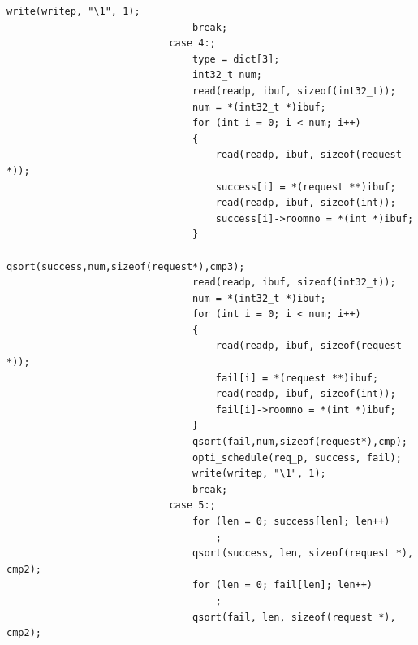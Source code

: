 \documentclass{article}
\begin{document}
\begin{Verbatim}[gobble=8]
                                write(writep, "\1", 1);
                                break;
                            case 4:;
                                type = dict[3];
                                int32_t num;
                                read(readp, ibuf, sizeof(int32_t));
                                num = *(int32_t *)ibuf;
                                for (int i = 0; i < num; i++)
                                {
                                    read(readp, ibuf, sizeof(request *));
                                    success[i] = *(request **)ibuf;
                                    read(readp, ibuf, sizeof(int));
                                    success[i]->roomno = *(int *)ibuf;
                                }
                                qsort(success,num,sizeof(request*),cmp3);
                                read(readp, ibuf, sizeof(int32_t));
                                num = *(int32_t *)ibuf;
                                for (int i = 0; i < num; i++)
                                {
                                    read(readp, ibuf, sizeof(request *));
                                    fail[i] = *(request **)ibuf;
                                    read(readp, ibuf, sizeof(int));
                                    fail[i]->roomno = *(int *)ibuf;
                                }
                                qsort(fail,num,sizeof(request*),cmp);
                                opti_schedule(req_p, success, fail);
                                write(writep, "\1", 1);
                                break;
                            case 5:;
                                for (len = 0; success[len]; len++)
                                    ;
                                qsort(success, len, sizeof(request *), cmp2);
                                for (len = 0; fail[len]; len++)
                                    ;
                                qsort(fail, len, sizeof(request *), cmp2);
                

\end{Verbatim}
\end{document}
